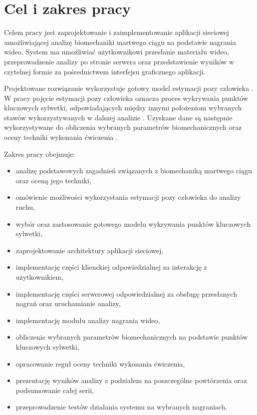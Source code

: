 \section{Cel i zakres pracy}

Celem pracy jest zaprojektowanie i zaimplementowanie aplikacji sieciowej umożliwiającej analizę biomechaniki martwego ciągu na podstawie nagrania wideo. System ma umożliwiać użytkownikowi przesłanie materiału wideo, przeprowadzenie analizy po stronie serwera oraz przedstawienie wyników w czytelnej formie za pośrednictwem interfejsu graficznego aplikacji.

Projektowane rozwiązanie wykorzystuje gotowy model estymacji pozy człowieka \cite{mediapipe_pose_landmarker}. W pracy pojęcie estymacji pozy człowieka oznacza proces wykrywania punktów kluczowych sylwetki, odpowiadających między innymi położeniom wybranych stawów wykorzystywanych w dalszej analizie \cite{mediapipe_pose_docs}. Uzyskane dane są następnie wykorzystywane do obliczenia wybranych parametrów biomechanicznych oraz oceny techniki wykonania ćwiczenia \cite{wade2022markerless,mundt2024twodimensional}.

Zakres pracy obejmuje:
\begin{itemize}
\item analizę podstawowych zagadnień związanych z biomechaniką martwego ciągu oraz oceną jego techniki,
\item omówienie możliwości wykorzystania estymacji pozy człowieka do analizy ruchu,
\item wybór oraz zastosowanie gotowego modelu wykrywania punktów kluczowych sylwetki,
\item zaprojektowanie architektury aplikacji sieciowej,
\item implementację części klienckiej odpowiedzialnej za interakcję z użytkownikiem,
\item implementację części serwerowej odpowiedzialnej za obsługę przesłanych nagrań oraz uruchamianie analizy,
\item implementację modułu analizy nagrania wideo,
\item obliczenie wybranych parametrów biomechanicznych na podstawie punktów kluczowych sylwetki,
\item opracowanie reguł oceny techniki wykonania ćwiczenia,
\item prezentację wyników analizy z podziałem na poszczególne powtórzenia oraz podsumowanie całej serii,
\item przeprowadzenie testów działania systemu na wybranych nagraniach.
\end{itemize}

